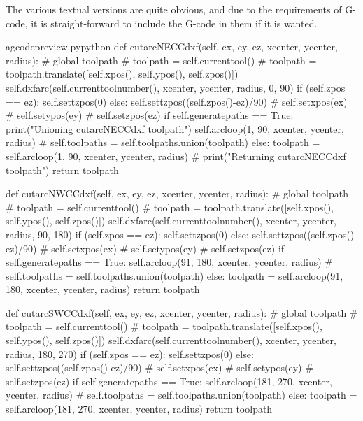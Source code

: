 \documentclass{ltxdoc}
\begin{document}
The various textual versions are quite obvious, and due to the requirements of G-code, it is straight-forward to include the G-code in them if it is wanted.


\lstset{firstnumber=\thegcpy}
\begin{writecode}{a}{gcodepreview.py}{python}
    def cutarcNECCdxf(self, ex, ey, ez, xcenter, ycenter, radius):
#        global toolpath
#        toolpath = self.currenttool()
#        toolpath = toolpath.translate([self.xpos(), self.ypos(), self.zpos()])
        self.dxfarc(self.currenttoolnumber(), xcenter, ycenter, radius, 0, 90)
        if (self.zpos == ez):
            self.settzpos(0)
        else:         
            self.settzpos((self.zpos()-ez)/90)
#        self.setxpos(ex)
#        self.setypos(ey)
#        self.setzpos(ez)
        if self.generatepaths == True:
            print("Unioning cutarcNECCdxf toolpath")
            self.arcloop(1, 90, xcenter, ycenter, radius)
#            self.toolpaths = self.toolpaths.union(toolpath)
        else:
            toolpath = self.arcloop(1, 90, xcenter, ycenter, radius)
#            print("Returning cutarcNECCdxf toolpath")
            return toolpath

    def cutarcNWCCdxf(self, ex, ey, ez, xcenter, ycenter, radius):
#        global toolpath
#        toolpath = self.currenttool()
#        toolpath = toolpath.translate([self.xpos(), self.ypos(), self.zpos()])
        self.dxfarc(self.currenttoolnumber(), xcenter, ycenter, radius, 90, 180)
        if (self.zpos == ez):
            self.settzpos(0)
        else:         
            self.settzpos((self.zpos()-ez)/90)
#        self.setxpos(ex)
#        self.setypos(ey)
#        self.setzpos(ez)
        if self.generatepaths == True:
            self.arcloop(91, 180, xcenter, ycenter, radius)
#            self.toolpaths = self.toolpaths.union(toolpath)
        else:
            toolpath = self.arcloop(91, 180, xcenter, ycenter, radius)
            return toolpath

    def cutarcSWCCdxf(self, ex, ey, ez, xcenter, ycenter, radius):
#        global toolpath
#        toolpath = self.currenttool()
#        toolpath = toolpath.translate([self.xpos(), self.ypos(), self.zpos()])
        self.dxfarc(self.currenttoolnumber(), xcenter, ycenter, radius, 180, 270)
        if (self.zpos == ez):
            self.settzpos(0)
        else:         
            self.settzpos((self.zpos()-ez)/90)
#        self.setxpos(ex)
#        self.setypos(ey)
#        self.setzpos(ez)
        if self.generatepaths == True:
            self.arcloop(181, 270, xcenter, ycenter, radius)
#            self.toolpaths = self.toolpaths.union(toolpath)
        else:
            toolpath = self.arcloop(181, 270, xcenter, ycenter, radius)
            return toolpath


\end{writecode}
\end{document}
